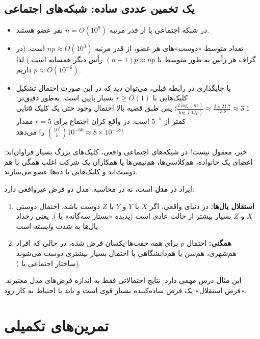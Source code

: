 \subsection{یک تخمین عددی ساده: شبکه‌های اجتماعی}
\begin{itemize}
\item در شبکه اجتماعی  یا  از قدر مرتبه $n=O(10^9)$ نفر عضو هستند.
\item تعداد متوسط «دوست»های هر عضو، از قدر مرتبه $np\approx O(10^3)$ است. (در گراف  هر رأس به طور متوسط با $(n-1)p\approx np$ رأس دیگر همسایه است.) لذا داریم $p\approx O(10^{-6})$.
\item با جایگذاری در رابطه قبلی، می‌توان دید که در این صورت احتمال تشکیل کلیک‌هایی با $r\ge O(1)$ بسیار پایین است. به‌طور دقیق‌تر: $\frac{2\log(ne)}{\log(1/p)}\approx\frac{2\times21.7}{13.8}\approx3.1$؛ پس طبق قضیه بالا احتمال وجود حتی یک کلیک ۵تایی کمتر از $5^{-5}$ است. در واقع کران اجتماع برای $r=5$ مقدار $\binom{10^9}{5}10^{-60}\approx8\times10^{-18}$ را می‌دهد!
\end{itemize}

\begin{question}
\begin{answer}
خیر، معقول نیست! در شبکه‌های اجتماعی واقعی، کلیک‌های بزرگ بسیار فراوان‌اند: اعضای یک خانواده، هم‌کلاسی‌ها، هم‌تیمی‌ها یا همکاران یک شرکت اغلب همگی با هم دوست‌اند و کلیک‌هایی با ده‌ها عضو می‌سازند.

ایراد در \textbf{مدل} است، نه در محاسبه. مدل  دو فرض غیرواقعی دارد:
\begin{enumerate}
\item \textbf{استقلال یال‌ها:} در دنیای واقعی، اگر $X$ با $Y$ و $Y$ با $Z$ دوست باشد، احتمال دوستی $X$ و $Z$ بسیار بیشتر از حالت عادی است (پدیده «بستار سه‌گانه» یا ). یعنی رخداد یال‌ها به شدت \emph{وابسته} است.
\item \textbf{همگنی:} احتمال $p$ برای همه جفت‌ها یکسان فرض شده، در حالی که افراد هم‌شهری، هم‌سن یا هم‌دانشگاهی با احتمال بسیار بیشتری دوست می‌شوند (ساختار اجتماعی یا ).
\end{enumerate}
این مثال درس مهمی دارد: نتایج احتمالاتی فقط به اندازه فرض‌های مدل معتبرند. «فرض استقلال» یک فرض ساده‌کننده بسیار قوی است و باید با احتیاط به کار رود.
\end{answer}
\end{question}

\section{تمرین‌های تکمیلی}

